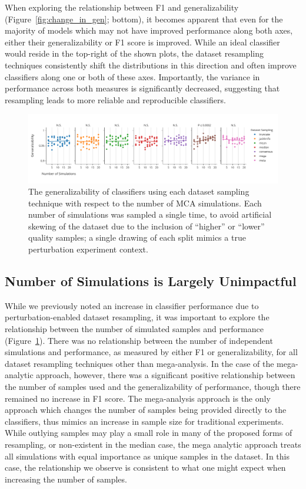 \documentclass[num-refs]{nbdt-article}
\begin{document}
When exploring the relationship between F1 and generalizability (Figure~\ref{fig:change_in_gen}; bottom), it becomes apparent that even for the majority of models which may not have improved performance along both axes, either their generalizability or F1 score is improved. While an ideal classifier would reside in the top-right of the shown plots, the dataset resampling techniques consistently shift the distributions in this direction and often improve classifiers along one or both of these axes. Importantly, the variance in performance across both measures is significantly decreased, suggesting that resampling leads to more reliable and reproducible classifiers.

\begin{figure}[t!]\centering
\includegraphics[width=\linewidth]{figures/3.pdf}
\caption{The generalizability of classifiers using each dataset sampling technique with respect to the number of MCA simulations. Each number of simulations was sampled a single time, to avoid artificial skewing of the dataset due to the inclusion of ``higher'' or ``lower'' quality samples; a single drawing of each split mimics a true perturbation experiment context.}
\label{fig:nmca}
\end{figure}

\subsection{Number of Simulations is Largely Unimpactful}
While we previously noted an increase in classifier performance due to perturbation-enabled dataset resampling, it was important to explore the relationship between the number of simulated samples and performance (Figure~\ref{fig:nmca}). There was no relationship between the number of independent simulations and performance, as measured by either F1 or generalizability, for all dataset resampling techniques other than mega-analysis. In the case of the mega-analytic approach, however, there was a significant positive relationship between the number of samples used and the generalizability of performance, though there remained no increase in F1 score. The mega-analysis approach is the only approach which changes the number of samples being provided directly to the classifiers, thus mimics an increase in sample size for traditional experiments. While outlying samples may play a small role in many of the proposed forms of resampling, or non-existent in the median case, the mega analytic approach treats all simulations with equal importance as unique samples in the dataset. In this case, the relationship we observe is consistent to what one might expect when increasing the number of samples.
\end{document}
